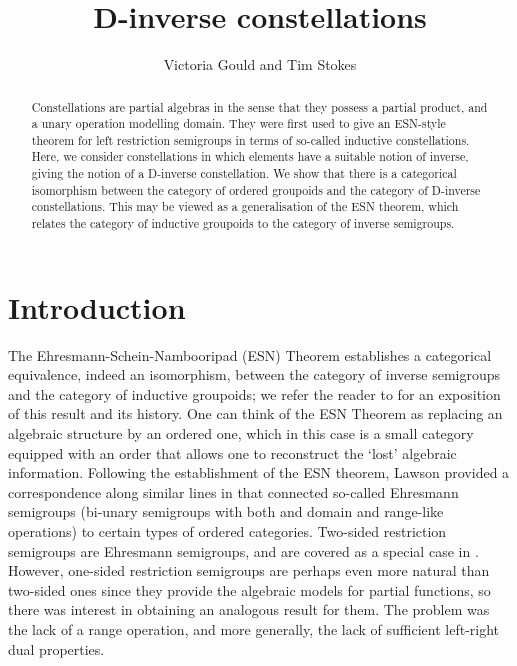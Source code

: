 \documentclass[12pt]{amsart}
\theoremstyle{definition}
\begin{document}
\title{D-inverse constellations}
\author{Victoria Gould and Tim Stokes}

\date{}


\begin{abstract} Constellations are partial algebras in the sense that they possess a partial product, and a unary operation modelling domain.  They were first used to give an ESN-style theorem for left restriction semigroups in terms of so-called inductive constellations.  Here, we consider constellations in which elements have a suitable notion of inverse, giving the notion of a D-inverse constellation.  We show that there is a categorical isomorphism between the category of ordered groupoids and the category of D-inverse constellations.  This may be viewed as a generalisation of the ESN theorem, which relates the category of inductive groupoids to the category of inverse semigroups.
\end{abstract}

\maketitle

\section{Introduction}\label{sec:intro}  

The Ehresmann-Schein-Nambooripad (ESN) Theorem establishes a categorical equivalence, indeed an isomorphism, between the category of inverse semigroups and the category of inductive groupoids;  we refer the reader to \cite{lawsoninverse} for an exposition of this result and its history. One can think of the ESN Theorem as replacing an algebraic structure by an ordered one, which in this case is a small category 
equipped with an order that allows one to reconstruct the `lost' algebraic information. 
Following the establishment of the ESN theorem, Lawson provided a correspondence along similar lines in \cite{lawson1} that connected so-called Ehresmann semigroups (bi-unary semigroups with both and domain and range-like operations) to certain types of ordered categories.  Two-sided restriction semigroups are Ehresmann semigroups, and are covered as a special case in \cite{lawson1}.  However, one-sided restriction semigroups are perhaps even more natural than two-sided ones since they provide the algebraic models for partial functions, so there was interest in obtaining an analogous result for them.  The problem was the lack of a range operation, and more generally, the lack of sufficient left-right dual properties. 
\end{document}
